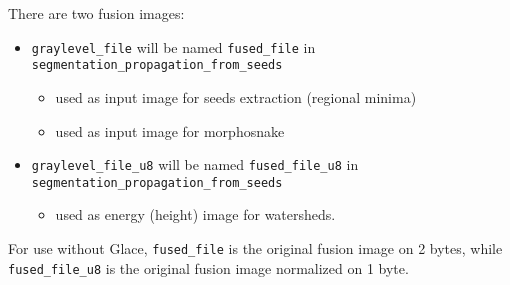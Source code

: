 \documentclass{article}
\def \mycolor {red}
\begin{document}
\color{\mycolor}
There are two fusion images:
\begin{itemize}
\itemsep -0.5ex
\item \verb|graylevel_file| will be named \verb|fused_file| in \verb|segmentation_propagation_from_seeds|
\begin{itemize}
\itemsep -0.5ex
\item used as input image for seeds extraction (regional minima)
\item used as input image for morphosnake
\end{itemize}
\item \verb|graylevel_file_u8| will be named \verb|fused_file_u8| in \verb|segmentation_propagation_from_seeds|
\begin{itemize}
\itemsep -0.5ex
\item used as energy (height) image for watersheds.
\end{itemize}
\end{itemize}
For use without Glace, \verb|fused_file| is the original fusion image on 2 bytes, while \verb|fused_file_u8| is the original fusion image normalized on 1 byte. 
\end{document}
